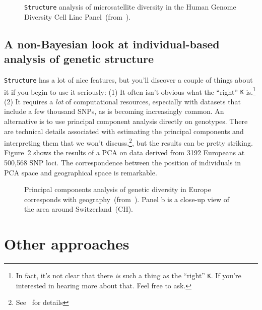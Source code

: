 \begin{figure}
\caption{{\tt Structure} analysis of microsatellite diversity in the
  Human Genome Diversity Cell Line
  Panel~(from~\cite{Rosenberg-etal-2002}).}\label{fig:HGDP-CEPH} 
\end{figure}

\subsection*{A non-Bayesian look at individual-based analysis of
  genetic structure}

{\tt Structure} has a lot of nice features, but you'll discover a
couple of things about it if you begin to use it seriously: (1) It
often isn't obvious what the ``right'' {\tt K} is.\footnote{In fact,
  it's not clear that there {\it is\/} such a thing as the ``right''
  {\tt K}. If you're interested in hearing more about that. Feel free
  to ask.} (2) It requires a {\it lot\/} of computational resources,
especially with datasets that include a few thousand SNPs, as is
becoming increasingly common. An alternative is to use principal
component analysis directly on genotypes. There are technical details
associated with estimating the principal components and interpreting
them that we won't discuss,\footnote{See~\cite{Novembre-Stephens-2008}
  for details}, but the results can be pretty
striking. Figure~\ref{fig:human-PCA} shows the results of a PCA on
data derived from 3192 Europeans at 500,568 SNP loci. The
correspondence between the position of individuals in PCA space and
geographical space is remarkable. 

\begin{figure}
\caption{Principal components analysis of genetic diversity in Europe
  corresponds with
  geography~(from~\cite{Novembre-etal-2008}). Panel b is a close-up
  view of the area around Switzerland~(CH).}\label{fig:human-PCA}
\end{figure}

\section*{Other approaches}

